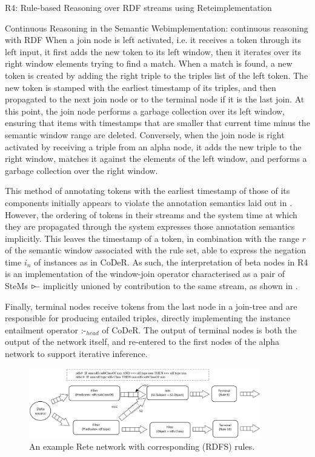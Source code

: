 \begin{nestedsection}{R4: Rule-based Reasoning over RDF streams using Rete}{implementation}
\begin{nestedsection}{Continuous Reasoning in the Semantic Web}{implementation: continuous reasoning with RDF}
		When a join node is left activated, i.e. it receives a token through its left input, it first adds the new token to its left window, then it iterates over its right window elements trying to find a match.
		When a match is found, a new token is created by adding the right triple to the triples list of the left token.
		The new token is stamped with the earliest timestamp of its triples, and then propagated to the next join node or to the terminal node if it is the last join.
		At this point, the join node performs a garbage collection over its left window, ensuring that items with timestamps that are smaller that current time minus the semantic window range are deleted.
		Conversely, when the join node is right activated by receiving a triple from an alpha node, it adds the new triple to the right window, matches it against the elements of the left window, and performs a garbage collection over the right window.

		This method of annotating tokens with the earliest timestamp of those of its components initially appears to violate the annotation semantics laid out in .
		However, the ordering of tokens in their streams and the system time at which they are propagated through the system expresses those annotation semantics implicitly.
		This leaves the timestamp of a token, in combination with the range $r$ of the semantic window associated with the rule set, able to express the negation time $i_n$ of instances as in CoDeR.
		As such, the interpretation of beta nodes in R4 is an implementation of the window-join operator characterised as a pair of SteMs $\rstreamjoin$ implicitly unioned by contribution to the same stream, as shown in .

 		Finally, terminal nodes receive tokens from the last node in a join-tree and are responsible for producing entailed triples, directly implementing the instance entailment operator $\text{:-}_{head}$ of CoDeR.
 		The output of terminal nodes is both the output of the network itself, and re-entered to the first nodes of the alpha network to support iterative inference.

 		\begin{figure}[t]
 			\centering
 			\includegraphics[width=0.9\textwidth]{example-rete-network.png}
 			\caption{An example Rete network with corresponding (RDFS) rules.}
 		\end{figure}
	\end{nestedsection}
\end{nestedsection}
